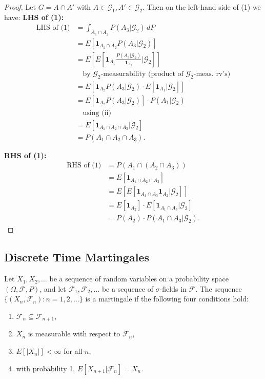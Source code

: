 \begin{proof}
Let $G = A \cap A'$ with $A \in \mathcal{G}_1, A' \in \mathcal{G}_2$. Then on the left-hand side of (1) we have:
\textbf{LHS of (1):}
\begin{align*}
\text{LHS of (1)} &= \int_{A_1 \cap A_2} P(A_3|\mathcal{G}_2) \, dP \\
&= E\left[\mathbf{1}_{A_1 \cap A_2} P(A_3|\mathcal{G}_2)\right] \\
&= E\left[E\left[\mathbf{1}_{A_1} \frac{P(A_3|\mathcal{G}_2)}{\mathbf{1}_{A_2}} \Big| \mathcal{G}_2\right]\right] \\
&\quad \text{by $\mathcal{G}_2$-measurability (product of $\mathcal{G}_2$-meas. rv's)} \\
&= E\left[\mathbf{1}_{A_2} P(A_3|\mathcal{G}_2) \cdot E\left[\mathbf{1}_{A_1} | \mathcal{G}_2\right]\right] \\
&= E\left[\mathbf{1}_{A_2} P(A_3|\mathcal{G}_2)\right] \cdot P(A_1 | \mathcal{G}_2) \\
&\quad \text{using (ii)} \\
&= E\left[\mathbf{1}_{A_1 \cap A_2 \cap A_3} | \mathcal{G}_2\right] \\
&= P(A_1 \cap A_2 \cap A_3).
\end{align*}

\textbf{RHS of (1):}
\begin{align*}
\text{RHS of (1)} &= P(A_1 \cap (A_2 \cap A_3)) \\
&= E\left[\mathbf{1}_{A_1 \cap A_2 \cap A_3}\right] \\
&= E\left[E\left[\mathbf{1}_{A_1 \cap A_3} {\mathbf{1}_{A_2}}\Big| \mathcal{G}_2\right]\right] \\
&= E\left[\mathbf{1}_{A_2}\right] \cdot E\left[\mathbf{1}_{A_1 \cap A_3} | \mathcal{G}_2\right] \\
&= P(A_2) \cdot P(A_1 \cap A_3 | \mathcal{G}_2).
\end{align*}
\end{proof}



\subsection{Discrete Time Martingales}

\begin{definition}
Let \( X_1, X_2, \ldots \) be a sequence of random variables on a probability space \( (\Omega, \mathcal{F}, P) \), and let \( \mathcal{F}_1, \mathcal{F}_2, \ldots \) be a sequence of \(\sigma\)-fields in \( \mathcal{F} \). The sequence \( \{ (X_n, \mathcal{F}_n) : n = 1, 2, \ldots \} \) is a martingale if the following four conditions hold:
\begin{enumerate}
    \item \( \mathcal{F}_n \subseteq \mathcal{F}_{n+1} \),
    \item \( X_n \) is measurable with respect to \( \mathcal{F}_n \),
    \item \( E[|X_n|] < \infty \) for all \( n \),
    \item with probability 1, \( E[X_{n+1} | \mathcal{F}_n] = X_n \).
\end{enumerate}
\end{definition}

